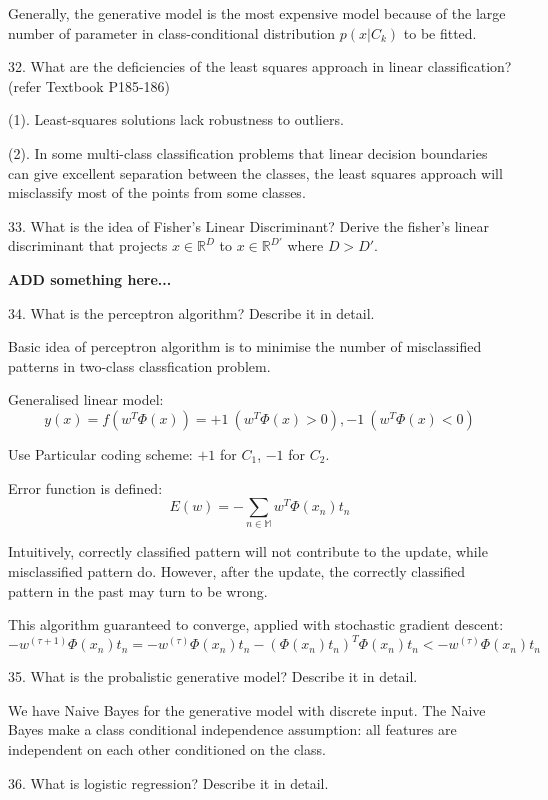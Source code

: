 \documentclass[11pt,a4paper]{article}
\newcommand{\BOLD}[1]{\textbf{#1}}
\begin{document}
    Generally, the generative model is the most expensive model because of the large number of parameter in class-conditional distribution $p(x| C_k)$ to be fitted. 

    32. What are the deficiencies of the least squares approach in linear classification? (refer Textbook P185-186)
    
    (1). Least-squares solutions lack robustness to outliers.

    (2). In some multi-class classification problems that linear decision boundaries can give excellent separation between the classes, the least squares approach will misclassify most of the points from some classes.
    
33. What is the idea of Fisher's Linear Discriminant? Derive the fisher's linear discriminant that projects $x \in \mathbb{R}^D$ to $x \in \mathbb{R}^{D'}$ where $D > D'$.

    \BOLD{ADD something here...}

34. What is the perceptron algorithm? Describe it in detail.

    Basic idea of perceptron algorithm is to minimise the number of misclassified patterns in two-class classfication problem.

    Generalised linear model:
    $$ y(x) = f( w^T \Phi(x) ) = + 1 \ (w^T \Phi(x) > 0), -1 \ (w^T \Phi(x) < 0) $$

    Use Particular coding scheme: $+1$ for $C_1$, $-1$ for $C_2$.

    Error function is defined: 
    $$ E(w) = - \sum_{n\in \mathbb{M}} w^T \Phi(x_n) t_n $$

    Intuitively, correctly classified pattern will not contribute to the update, while misclassified pattern do. However, after the update, the correctly classified pattern in the past may turn to be wrong. 

    This algorithm guaranteed to converge, applied with stochastic gradient descent:
    $$ - w^{(\tau + 1)} \Phi(x_n) t_n = - w^{(\tau)} \Phi(x_n) t_n - (\Phi(x_n) t_n)^T \Phi(x_n) t_n < - w^{(\tau)} \Phi(x_n) t_n $$

35. What is the probalistic generative model? Describe it in detail.

    We have Naive Bayes for the generative model with discrete input. The Naive Bayes make a class conditional independence assumption: all features are independent on each other conditioned on the class.

36. What is logistic regression? Describe it in detail.
\end{document}
